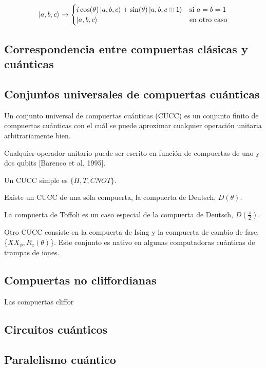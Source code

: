\documentclass[11pt, spanish]{report}
\begin{document}
\[
\ket{a,b,c} \rightarrow
\begin{cases}
i \cos(\theta) \ket{a,b,c} + \sin(\theta) \ket{a,b,c \oplus 1} & \text{si } a=b=1 \\
\ket{a,b,c} & \text{en otro caso}
\end{cases}
\]

\subsection{Correspondencia entre compuertas clásicas y cuánticas}

\subsection{Conjuntos universales de compuertas cuánticas}
Un conjunto universal de compuertas cuánticas (CUCC) es un conjunto finito de compuertas cuánticas con el cuál se puede aproximar cualquier operación unitaria arbitrariamente bien.
\vspace{0.5cm}

Cualquier operador unitario puede ser escrito en función de compuertas de uno y dos qubits [Barenco et al. 1995].
\vspace{0.5cm}

Un CUCC simple es $\{H,T,\mathit{CNOT}\}$.
\vspace{0.5cm}

Existe un CUCC de una sóla compuerta, la compuerta de Deutsch, $D(\theta)$.
\vspace{0.5cm}

La compuerta de Toffoli es un caso especial de la compuerta de Deutsch, $D(\frac{\pi}{2})$.
\vspace{0.5cm}

Otro CUCC consiste en la compuerta de Ising y la compuerta de cambio de fase, \{$\mathit{XX}_\phi,R_z(\theta)$\}. Este conjunto es nativo en algunas computadoras cuánticas de trampas de iones.

\subsection{Compuertas no cliffordianas}
Las compuertas cliffor


\subsection{Circuitos cuánticos}

\subsection{Paralelismo cuántico}
\end{document}
